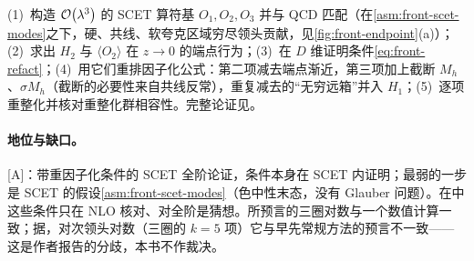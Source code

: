 \begin{proofsketch}
(1)~构造 $\mathcal{O}\!\left(\lambda^3\right)$ 的 SCET 算符基 $O_1,O_2,O_3$ 并与 QCD 匹配（在\cref{asm:front-scet-modes}之下，硬、共线、软夸克区域穷尽领头贡献，见\cref{fig:front-endpoint}(a)）；(2)~求出 $H_2$ 与 $\langle O_2\rangle$ 在 $z\to0$ 的端点行为；(3)~在 $D$ 维证明条件\cref{eq:front-refact}；(4)~用它们重排因子化公式：第二项减去端点渐近，第三项加上截断 $M_h$、$\sigma M_h$（截断的必要性来自共线反常），重复减去的“无穷远箱”并入 $H_1$；(5)~逐项重整化并核对重整化群相容性。完整论证见\cite{Liu:2019oav,Liu:2020wbn}。
\end{proofsketch}

\paragraph{地位与缺口。}[A]：带重因子化条件的 SCET 全阶论证，条件本身在 SCET 内证明；最弱的一步是 SCET 的假设\cref{asm:front-scet-modes}（色中性末态，没有 Glauber 问题）。在\cite{Liu:2019oav}中这些条件只在 NLO 核对、对全阶是猜想。所预言的三圈对数与一个数值计算一致；据\cite{Liu:2020wbn}，对次领头对数（三圈的 $k=5$ 项）它与早先常规方法的预言不一致——这是作者报告的分歧，本书不作裁决。

